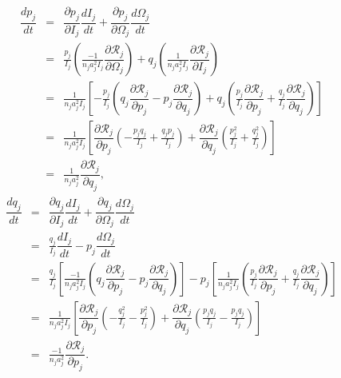 \documentclass [12pt, a4paper] {article}
\newcommand{\pdiff}[2]
{
	\dfrac{\partial #1}{\partial #2}
}
\newcommand{\diff}[2]
{
	\dfrac{d #1}{d #2}
}
\begin{document}
\begin {eqnarray}
    \diff{p_j}{t}
    &=& 
    \pdiff{p_j}{I_j}\diff{I_j}{t} + \pdiff{p_j}{\Omega_j}\diff{\Omega_j}{t}
    \\
    &=&
    \frac{p_j}{I_j}
    \left(
        \frac{-1}{n_ja_j^2I_j}\pdiff{\mathcal{R}_j}{\Omega_j}
    \right)
    +
    q_j 
    \left(
        \frac{1}{n_ja_j^2I_j}\pdiff{\mathcal{R}_j}{I_j}
    \right)
    \\
    &=&
    \frac{1}{n_ja_j^2I_j}
    \left[
        -\frac{p_j}{I_j}
        \left(
            q_j\pdiff{\mathcal{R}_j}{p_j} - p_j\pdiff{\mathcal{R}_j}{q_j}
        \right)
        + 
        q_j
        \left(
            \frac{p_j}{I_j}\pdiff{\mathcal{R}_j}{p_j} 
            +
            \frac{q_j}{I_j}\pdiff{\mathcal{R}_j}{q_j}
        \right)
    \right]
    \\
    &=&
    \frac{1}{n_ja_j^2I_j}
    \left[
        \pdiff{\mathcal{R}_j}{p_j}
        \left(
            -\frac{p_jq_j}{I_j} + \frac{q_jp_j}{I_j}
        \right)
        +
        \pdiff{\mathcal{R}_j}{q_j}
        \left(
            \frac{p_j^2}{I_j} + \frac{q_j^2}{I_j}
        \right)
    \right]
    \\
    &=& 
    \frac{1}{n_ja_j^2}\pdiff{\mathcal{R}_j}{q_j},
\end {eqnarray}
\begin {eqnarray}
    \diff{q_j}{t}
    &=& 
    \pdiff{q_j}{I_j}\diff{I_j}{t} + \pdiff{q_j}{\Omega_j}\diff{\Omega_j}{t}
    \\
    &=& 
    \frac{q_j}{I_j}\diff{I_j}{t} - p_j\diff{\Omega_j}{t} 
    \\
    &=&
    \frac{q_j}{I_j}
    \left[
        \frac{-1}{n_ja_j^2I_j}
        \left(
            q_j\pdiff{\mathcal{R}_j}{p_j}
            - 
            p_j\pdiff{\mathcal{R}_j}{q_j}
        \right)
    \right]
    -
    p_j
    \left[
        \frac{1}{n_ja_j^2I_j}
        \left(
            \frac{p_j}{I_j}\pdiff{\mathcal{R}_j}{p_j}
            +
            \frac{q_j}{I_j}\pdiff{\mathcal{R}_j}{q_j}
        \right)
    \right]
    \\
    &=&
    \frac{1}{n_ja_j^2I_j}
    \left[
        \pdiff{\mathcal{R}_j}{p_j}
        \left(
            -\frac{q_j^2}{I_j}
            -\frac{p_j^2}{I_j}
        \right)
        +
        \pdiff{\mathcal{R}_j}{q_j}
        \left(
            \frac{p_jq_j}{I_j}
            -
            \frac{p_jq_j}{I_j}
        \right)
    \right]    
    \\
    &=&
    \frac{-1}{n_ja_j^2}\pdiff{\mathcal{R}_j}{p_j}.
\end {eqnarray}
\end{document}
